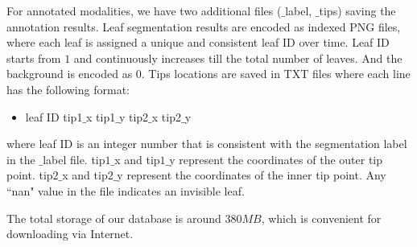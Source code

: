 For annotated modalities, we have two additional files ($\_$label, $\_$tips) saving the annotation results.
Leaf segmentation results are encoded as indexed PNG files, where each leaf is assigned a unique and consistent leaf ID over time.
Leaf ID starts from $1$ and continuously increases till the total number of leaves.
And the background is encoded as $0$.
Tips locations are saved in TXT files where each line has the following format:
\begin{itemize}
\item leaf ID \quad tip1$\_$x \quad tip1$\_$y \quad tip2$\_$x \quad tip2$\_$y
\end{itemize}
where leaf ID is an integer number that is consistent with the segmentation label in the $\_$label file.
tip$1\_$x and tip$1\_$y represent the coordinates of the outer tip point.
tip$2\_$x and tip$2\_$y represent the coordinates of the inner tip point.
Any ``nan" value in the file indicates an invisible leaf.


The total storage of our database is around $380 MB$, which is convenient for downloading via Internet.

